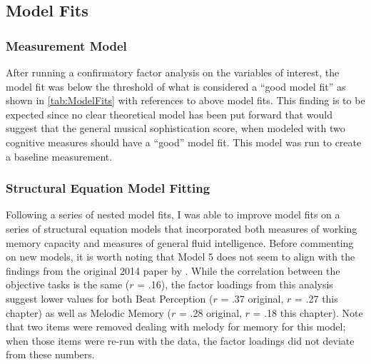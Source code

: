 \documentclass[12pt,]{book}
\begin{document}
\hypertarget{model-fits}{%
\subsection{Model Fits}\label{model-fits}}

\hypertarget{measurement-model-1}{%
\subsubsection{Measurement Model}\label{measurement-model-1}}

After running a confirmatory factor analysis on the variables of interest, the model fit was below the threshold of what is considered a ``good model fit'' as shown in \ref{tab:ModelFits} with references to above model fits.
This finding is to be expected since no clear theoretical model has been put forward that would suggest that the general musical sophistication score, when modeled with two cognitive measures should have a ``good'' model fit.
This model was run to create a baseline measurement.

\hypertarget{structural-equation-model-fitting}{%
\subsubsection{Structural Equation Model Fitting}\label{structural-equation-model-fitting}}

Following a series of nested model fits, I was able to improve model fits on a series of structural equation models that incorporated both measures of working memory capacity and measures of general fluid intelligence.
Before commenting on new models, it is worth noting that Model 5 does not seem to align with the findings from the original 2014 paper by \citep{mullensiefenMusicalityNonMusiciansIndex2014}.
While the correlation between the objective tasks is the same (\(r\) = .16), the factor loadings from this analysis suggest lower values for both Beat Perception (\(r\) = .37 original, \(r\) = .27 this chapter) as well as Melodic Memory (\(r\) = .28 original, \(r\) = .18 this chapter).
Note that two items were removed dealing with melody for memory for this model; when those items were re-run with the data, the factor loadings did not deviate from these numbers.
\end{document}

